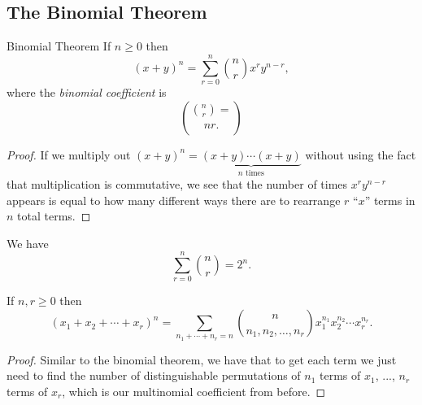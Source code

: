 \documentclass[class=article, crop=false]{standalone}
\begin{document}
  \subsection{The Binomial Theorem}
  \begin{theorem}{Binomial Theorem}
    If $n\geq 0$ then
    \[
      (x + y)^n = \sum_{r=0}^{n}\binom{n}{r}x^ry^{n - r},
    \]
    where the \emph{binomial coefficient} is
    \[
      \binom{n}{r} = \choose{n}{r}.
    \]
    \begin{proof}
      If we multiply out $(x + y)^n = \underbrace{(x + y)\dotsb(x + y)}_{n\text{ times}}$ without using the fact that multiplication is commutative, we see that the number of times $x^ry^{n - r}$ appears is equal to how many different ways there are to rearrange $r$ ``$x$'' terms in $n$ total terms.
    \end{proof}
  \end{theorem}
  \begin{theorem}{}
    We have
    \[
      \sum_{r=0}^{n} \binom{n}{r} = 2^n.
    \]
  \end{theorem}
  \begin{theorem}{}
    If $n, r\geq 0$ then
    \[
      (x_1 + x_2 + \dotsb + x_r)^n = \sum_{n_1 + \dotsb + n_r = n}\binom{n}{n_1, n_2, \dotsc, n_r}x_1^{n_1}x_2^{n_2}\dotsb x_r^{n_r}.
    \]
    \begin{proof}
      Similar to the binomial theorem, we have that to get each term we just need to find the number of distinguishable permutations of $n_1$ terms of $x_1$, ..., $n_r$ terms of $x_r$, which is our multinomial coefficient from before.
    \end{proof}
  \end{theorem}
\end{document}
